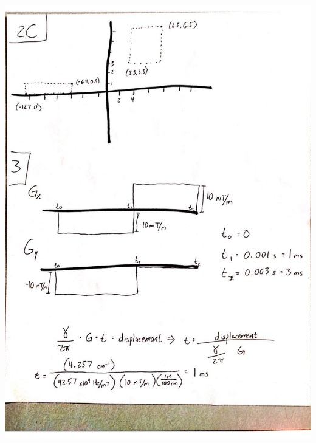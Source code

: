 \documentclass{article}
\begin{document}
\includegraphics[width=\textwidth]{../images/Problems2&3} \\
\end{document}
